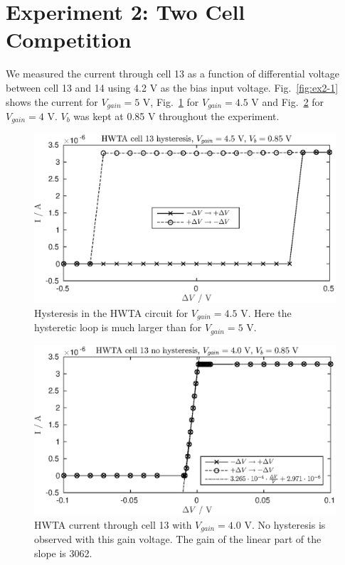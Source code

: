 \section{Experiment 2: Two Cell Competition}
We measured the current through cell 13 as a function of differential voltage between cell 13 and 14 using 4.2 V as the bias input voltage.
Fig.~\ref{fig:ex2-1} shows the current for \(V_{gain}=5\) V, Fig.~\ref{fig:ex2-2} for \(V_{gain}=4.5\) V and Fig.~\ref{fig:ex2-3} for \(V_{gain}=4\) V.
\(V_b\) was kept at 0.85 V throughout the experiment.
\begin{figure}
    \center
    \includegraphics{ex2-2.eps}
    \caption{Hysteresis in the HWTA circuit for \(V_{gain}=4.5\) V. Here the hysteretic loop is much larger than for \(V_{gain} = 5\) V.}
    \label{fig:ex2-2}
\end{figure}
\begin{figure}
    \center
    \includegraphics{ex2-3.eps}
    \caption{HWTA current through cell 13 with \(V_{gain}=4.0\) V. No hysteresis is observed with this gain voltage. The gain of the linear part of the slope is
    3062.}
    \label{fig:ex2-3}
\end{figure}


